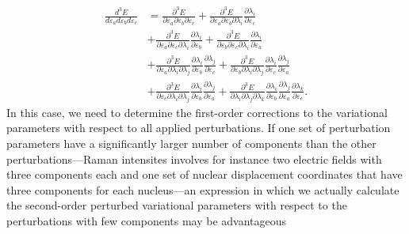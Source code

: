 \documentclass[%
 reprint,
 amsmath,amssymb,
 aps,
]{revtex4-1}
\begin{document}
\begin{align}
\label{eq:erg3}
\frac{d^{3}E}{d\varepsilon_ad\varepsilon_bd\varepsilon_c}
 & =
\frac{\partial^{3}E}{\partial\varepsilon_a\partial\varepsilon_b\partial\varepsilon_c}+\frac{\partial^{3}E}{\partial\varepsilon_a\partial\varepsilon_b\partial\lambda_{i}}\frac{\partial\lambda_{i}}{\partial\varepsilon_c}
 \\ & \nonumber
 +\frac{\partial^{3}E}{\partial\varepsilon_a\partial\varepsilon_c\partial\lambda_{i}}\frac{\partial\lambda_{i}}{\partial\varepsilon_b}
 +
 \frac{\partial^{3}E}{\partial\varepsilon_b\partial\varepsilon_c\partial\lambda_{i}}\frac{\partial\lambda_{i}}{\partial\varepsilon_a}\\\nonumber
& +
 \frac{\partial^{3}E}{\partial\varepsilon_a\partial\lambda_{i}\partial\lambda_{j}}\frac{\partial\lambda_{i}}{\partial\varepsilon_b}\frac{\partial\lambda_{j}}{\partial\varepsilon_c}
 +\frac{\partial^{3}E}{\partial\varepsilon_b\partial\lambda_{i}\partial\lambda_{j}}\frac{\partial\lambda_{i}}{\partial\varepsilon_c}\frac{\partial\lambda_{j}}{\partial\varepsilon_a}
  \\ & \nonumber +
 \frac{\partial^{3}E}{\partial\varepsilon_c\partial\lambda_{i}\partial\lambda_{j}}\frac{\partial\lambda_{i}}{\partial\varepsilon_b}\frac{\partial\lambda_{j}}{\partial\varepsilon_a}+\frac{\partial^{3}E}{\partial\lambda_{i}\partial\lambda_{j}\partial\lambda_{k}}\frac{\partial\lambda_{i}}{\partial\varepsilon_b}\frac{\partial\lambda_{j}}{\partial\varepsilon_a}\frac{\partial\lambda_{k}}{\partial\varepsilon_c}.\nonumber
\end{align}
In this case, we need to determine the first-order corrections to the
variational parameters with respect to all applied perturbations. If one set of
perturbation parameters have a significantly larger number of components than
the other perturbations---Raman intensites involves for instance two electric
fields with three components each and one set of nuclear displacement
coordinates that have three components for each nucleus---an expression in
which we actually calculate the second-order perturbed variational parameters
with respect to the perturbations with few components may be advantageous
\end{document}
